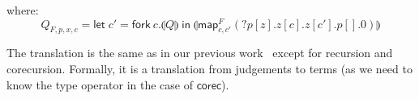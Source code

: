 \documentclass[orivec,envcountsame]{llncs}
\newcommand{\cpdual}[1]{#1^\perp}
\newcommand{\gvdual}[1]{\overline{#1}}
\newcommand{\gvout}[2]{{!#1.#2}}
\newcommand{\outterm}{\mathrm{end}_!}
\newcommand{\gvservice}[1]{\sharp #1}
\newcommand{\cptyp}[2]{#1 \vdash #2}
\newcommand{\gvtyp}[3]{#1 \vdash #2 : #3}
\newcommand{\mapname}{\mathsf{map}}
\newcommand{\map}[3]{\mapname^{#1}_{#2}(#3)}
\newcommand{\gvmap}[3]{\mapname^{#1}_{#2}\:#3}
\newcommand{\mkwd}[1]{\mathsf{#1}}
\newcommand{\derelict}[2]{{?#1[#2]}}
\newcommand{\gvsend}[2]{\mkwd{send}\:#1\:#2}
\newcommand{\gvlet}[3]{\mkwd{let}\;#1 = #2\;\mkwd{in}\;#3}
\newcommand{\gvfork}[2]{\mkwd{fork}\:#1.#2}
\newcommand{\gvrequest}[1]{\mkwd{request}\:#1}
\newcommand{\key}{\mkwd}
\newcommand{\togv}[1]{\llparenthesis #1 \rrparenthesis}
\newcommand{\mucp}{$\mu\mathrm{CP}$\xspace}
\newcommand{\mugv}{$\mu\mathrm{GV}$\xspace}
\newcommand{\todo}[1]{{\noindent\small\color{red} \framebox{\parbox{\dimexpr\linewidth-2\fboxsep-2\fboxrule}{\textbf{TODO:} #1}}}}
\begin{document}
where:
%
\[
  Q_{F,p,x,c} =
    \gvlet{c'}{\gvfork{c}{\togv{Q}}}
          {\togv{\map{F}{c,c'}{\derelict{p}{z}.z[c].z[c'].p[].0}}}
\]%


The translation is the same as in our previous work~\cite{LindleyM14} except for recursion and
corecursion. Formally, it is a translation from judgements to terms (as we need to know the type
operator in the case of $\key{corec}$).








\end{document}
